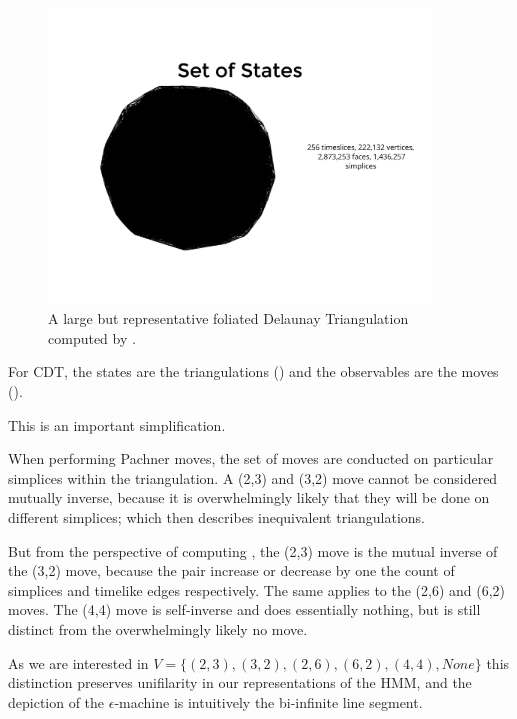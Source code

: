 \documentclass[12pt]{article}
\begin{document}
  \begin{figure}
    \begin{center}
    \includegraphics[width=4in]{3D-states.pdf}
    \caption{A large but representative foliated Delaunay Triangulation computed by \cite{getchell_cdt-plusplus:_2018}.\label{3D-states}}
    \end{center}
  \end{figure}

  For CDT, the states are the triangulations () and the observables are the moves ().

  This is an important simplification.
  
  When performing Pachner moves, the set of moves are conducted on particular simplices within the triangulation.
  A (2,3) and (3,2) move cannot be considered mutually inverse, because it is overwhelmingly likely that they will be done on different simplices;
  which then describes inequivalent triangulations.

  But from the perspective of computing , the (2,3) move is the mutual inverse of the (3,2) move, because the pair increase or decrease by one the count of simplices
  and timelike edges respectively. The same applies to the (2,6) and (6,2) moves. The (4,4) move is self-inverse and does essentially nothing, but is still distinct from
  the overwhelmingly likely no move.
  
  As we are interested in $V=\{(2,3), (3,2), (2,6), (6,2), (4,4), None\}$ this distinction preserves unifilarity in our representations of the HMM,
  and the depiction of the $\epsilon$-machine is intuitively the bi-infinite line segment.
\end{document}
